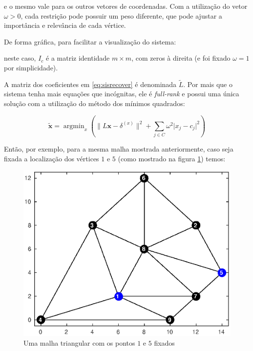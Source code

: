 \noindent e o mesmo vale para os outros vetores de coordenadas. Com a utilização do vetor $\omega > 0$, cada restrição pode possuir um peso diferente, que pode ajustar a importância e relevância de cada vértice.

De forma gráfica, para facilitar a visualização do sistema:

\begin{center}
\end{center}

\noindent neste caso, $I_c$ é a matriz identidade $m \times m$, com zeros à direita (e foi fixado $\omega = 1$ por simplicidade).

A matriz dos coeficientes em \ref{eq:sisrecover} é denominada $\tilde{L}$. Por mais que o sistema tenha mais equações que incógnitas, ele é \textit{full-rank} e possui uma única solução com a utilização do método dos mínimos quadrados:

\begin{equation}\label{eq:leastsqrsol}
\mathbf{\tilde{x}} = \mathop{\mathrm{argmin}}_x \left( \lVert L \mathbf{x} - \delta^{(x)} \rVert^2 + \sum_{j \in C} \omega^2 \lvert x_j - c_j \rvert^2  \right)
\end{equation}

Então, por exemplo, para a mesma malha mostrada anteriormente, caso seja fixada a localização dos vértices $1$ e $5$ (como mostrado na figura \ref{fig:fixedmesh}) temos:

\begin{figure}[ht!]
	\centering
	\includegraphics[width=.6\linewidth]{imagens/cap4/grafofixado.eps}
	\caption{Uma malha triangular com os pontos $1$ e $5$ fixados}
	\label{fig:fixedmesh}
\end{figure}


